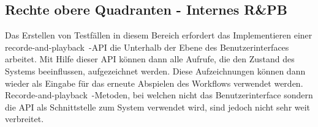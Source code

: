 \subsection{Rechte obere Quadranten - Internes R\&PB}
Das Erstellen von Testfällen in diesem Bereich erfordert das Implementieren einer \glqq recorde-and-playback\grqq\ -API die Unterhalb der Ebene des Benutzerinterfaces arbeitet. Mit Hilfe dieser API können dann alle Aufrufe, die den Zustand des Systems beeinflussen, aufgezeichnet werden. Diese Aufzeichnungen können dann wieder als Eingabe für das erneute Abspielen des Workflows verwendet werden.
\glqq Recorde-and-playback\grqq\ -Metoden, bei welchen nicht das Benutzerinterface sondern die API als Schnittstelle zum System verwendet wird, sind jedoch nicht sehr weit verbreitet.
